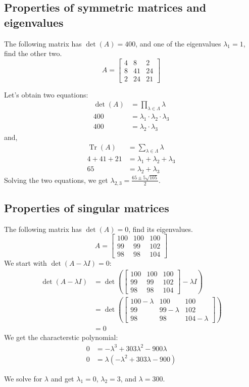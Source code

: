 \documentclass[addpoints]{exam}
\begin{document}
\subsection{Properties of symmetric matrices and eigenvalues}
The following matrix has $\det(A) = 400$, and one of the eigenvalues $\lambda_1 = 1$, find the other two.
\begin{equation*}
	A = \begin{bmatrix} 4 & 8 & 2 \\ 8 & 41 & 24 \\ 2 & 24 & 21 \end{bmatrix}
\end{equation*}

Let's obtain two equations:
\begin{align}
	\nonumber \det(A) &= \prod_{\lambda \in \Lambda}{\lambda}\\
	\nonumber 400 &= \lambda_1 \cdot \lambda_2 \cdot \lambda_3\\
	400 &= \lambda_2 \cdot \lambda_3
\end{align}
and,
\begin{align}
	\nonumber \operatorname{Tr}(A) &= \sum_{\lambda \in \Lambda}{\lambda}\\
	\nonumber 4 + 41 + 21 &= \lambda_1 + \lambda_2 + \lambda_3\\
	65 &= \lambda_2 + \lambda_3
\end{align}
Solving the two equations, we get $\lambda_{2, 3} = \frac{65 \pm 5 \sqrt{105}}{2}$.
\subsection{Properties of singular matrices}
The following matrix has $\det(A) = 0$, find its eigenvalues.
\begin{equation*}
	A = \begin{bmatrix} 100 & 100 & 100 \\ 99 & 99 & 102 \\ 98 & 98 & 104 \end{bmatrix}
\end{equation*}
We start with $\det(A - \lambda I) = 0$:
\begin{align*}
	\det(A - \lambda I) &= \det\left(\begin{bmatrix} 100 & 100 & 100 \\ 99 & 99 & 102 \\ 98 & 98 & 104 \end{bmatrix} - \lambda I\right) \\
	&= \det \left(\begin{bmatrix} 100 - \lambda & 100 & 100 \\ 99 & 99 - \lambda & 102 \\ 98 & 98 & 104 - \lambda \end{bmatrix} \right) \\
	&= 0
\end{align*}
We get the characterstic polynomial:
\begin{align*}
	0 &= -\lambda^3 + 303\lambda^2 - 900\lambda\\
	0 &= \lambda(-\lambda^2 + 303\lambda - 900)
\end{align*}

We solve for $\lambda$ and get $\lambda_1 = 0$, $\lambda_2 = 3$, and $\lambda = 300$.
\end{document}
